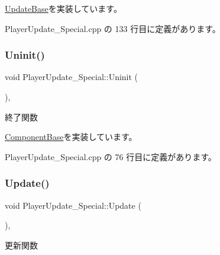 \mbox{\hyperlink{class_update_base_afc4956f78135aed5fc4e4f9991be50b9}{Update\+Base}}を実装しています。



 Player\+Update\+\_\+\+Special.\+cpp の 133 行目に定義があります。

\mbox{\label{class_player_update___special_a60b5982ed56b52293a9e651ae7bf305f}} 
\subsubsection{\texorpdfstring{Uninit()}{Uninit()}}
{\footnotesize\ttfamily void Player\+Update\+\_\+\+Special\+::\+Uninit (\begin{DoxyParamCaption}{ }\end{DoxyParamCaption})\hspace{0.3cm}{\ttfamily [override]}, {\ttfamily [virtual]}}



終了関数 



\mbox{\hyperlink{class_component_base_a9f42beaf0383d6f629819579cab4de57}{Component\+Base}}を実装しています。



 Player\+Update\+\_\+\+Special.\+cpp の 76 行目に定義があります。

\mbox{\label{class_player_update___special_afef3503e292dbaded809068fd87deadd}} 
\subsubsection{\texorpdfstring{Update()}{Update()}}
{\footnotesize\ttfamily void Player\+Update\+\_\+\+Special\+::\+Update (\begin{DoxyParamCaption}{ }\end{DoxyParamCaption})\hspace{0.3cm}{\ttfamily [override]}, {\ttfamily [virtual]}}



更新関数 



